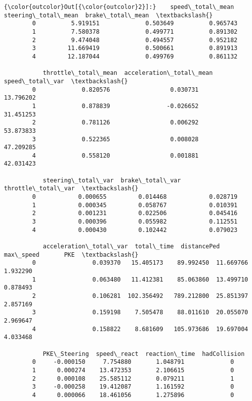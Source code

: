 \documentclass[11pt]{article}
\begin{document}
\begin{Verbatim}[commandchars=\\\{\}]
{\color{outcolor}Out[{\color{outcolor}2}]:}    speed\_total\_mean  steering\_total\_mean  brake\_total\_mean  \textbackslash{}
        0          5.919151             0.503649          0.965743   
        1          7.580378             0.499771          0.891302   
        2          9.474048             0.494557          0.952182   
        3         11.669419             0.500661          0.891913   
        4         12.187044             0.499769          0.861132   
        
           throttle\_total\_mean  acceleration\_total\_mean  speed\_total\_var  \textbackslash{}
        0             0.820576                 0.030731        13.796202   
        1             0.878839                -0.026652        31.451253   
        2             0.781126                 0.006292        53.873833   
        3             0.522365                 0.008028        47.209285   
        4             0.558120                 0.001881        42.031423   
        
           steering\_total\_var  brake\_total\_var  throttle\_total\_var  \textbackslash{}
        0            0.000655         0.014468            0.028719   
        1            0.000345         0.058767            0.010391   
        2            0.001231         0.022506            0.045416   
        3            0.000396         0.055982            0.112551   
        4            0.000430         0.102442            0.079023   
        
           acceleration\_total\_var  total\_time  distancePed  max\_speed       PKE  \textbackslash{}
        0                0.039370   15.405173    89.992450  11.669766  1.932290   
        1                0.063480   11.412381    85.063860  13.499710  0.878493   
        2                0.106281  102.356492   789.212800  25.851397  2.857169   
        3                0.159198    7.505478    88.011610  20.055070  2.969647   
        4                0.158822    8.681609   105.973686  19.697004  4.033468   
        
           PKE\_Steering  speed\_react  reaction\_time  hadCollision  
        0     -0.000150     7.754880       1.048791             0  
        1      0.000274    13.472353       2.106615             0  
        2      0.000108    25.585112       0.079211             1  
        3     -0.000258    19.412087       1.161592             0  
        4      0.000066    18.461056       1.275896             0  
\end{Verbatim}
            
\end{document}
